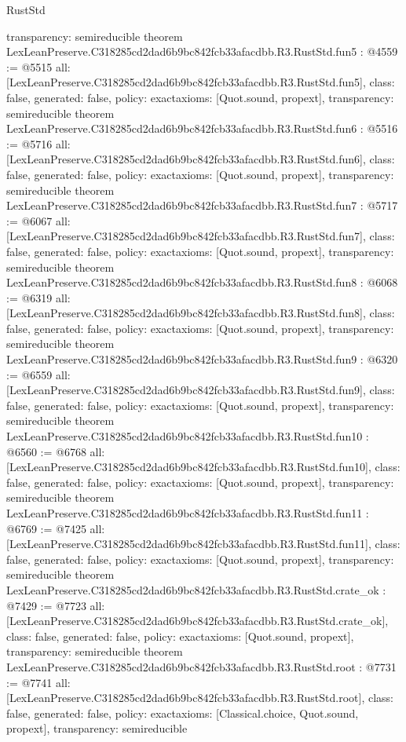 \begin{lexlean}{RustStd}
\begin{coremodule}
{  transparency: semireducible
}
theorem LexLeanPreserve.C318285cd2dad6b9bc842fcb33afacdbb.R3.RustStd.fun5 : @4559 := @5515 {
  all: [LexLeanPreserve.C318285cd2dad6b9bc842fcb33afacdbb.R3.RustStd.fun5],
  class: false,
  generated: false,
  policy: exact{axioms: [Quot.sound, propext]},
  transparency: semireducible
}
theorem LexLeanPreserve.C318285cd2dad6b9bc842fcb33afacdbb.R3.RustStd.fun6 : @5516 := @5716 {
  all: [LexLeanPreserve.C318285cd2dad6b9bc842fcb33afacdbb.R3.RustStd.fun6],
  class: false,
  generated: false,
  policy: exact{axioms: [Quot.sound, propext]},
  transparency: semireducible
}
theorem LexLeanPreserve.C318285cd2dad6b9bc842fcb33afacdbb.R3.RustStd.fun7 : @5717 := @6067 {
  all: [LexLeanPreserve.C318285cd2dad6b9bc842fcb33afacdbb.R3.RustStd.fun7],
  class: false,
  generated: false,
  policy: exact{axioms: [Quot.sound, propext]},
  transparency: semireducible
}
theorem LexLeanPreserve.C318285cd2dad6b9bc842fcb33afacdbb.R3.RustStd.fun8 : @6068 := @6319 {
  all: [LexLeanPreserve.C318285cd2dad6b9bc842fcb33afacdbb.R3.RustStd.fun8],
  class: false,
  generated: false,
  policy: exact{axioms: [Quot.sound, propext]},
  transparency: semireducible
}
theorem LexLeanPreserve.C318285cd2dad6b9bc842fcb33afacdbb.R3.RustStd.fun9 : @6320 := @6559 {
  all: [LexLeanPreserve.C318285cd2dad6b9bc842fcb33afacdbb.R3.RustStd.fun9],
  class: false,
  generated: false,
  policy: exact{axioms: [Quot.sound, propext]},
  transparency: semireducible
}
theorem LexLeanPreserve.C318285cd2dad6b9bc842fcb33afacdbb.R3.RustStd.fun10 : @6560 := @6768 {
  all: [LexLeanPreserve.C318285cd2dad6b9bc842fcb33afacdbb.R3.RustStd.fun10],
  class: false,
  generated: false,
  policy: exact{axioms: [Quot.sound, propext]},
  transparency: semireducible
}
theorem LexLeanPreserve.C318285cd2dad6b9bc842fcb33afacdbb.R3.RustStd.fun11 : @6769 := @7425 {
  all: [LexLeanPreserve.C318285cd2dad6b9bc842fcb33afacdbb.R3.RustStd.fun11],
  class: false,
  generated: false,
  policy: exact{axioms: [Quot.sound, propext]},
  transparency: semireducible
}
theorem LexLeanPreserve.C318285cd2dad6b9bc842fcb33afacdbb.R3.RustStd.crate_ok : @7429 := @7723 {
  all: [LexLeanPreserve.C318285cd2dad6b9bc842fcb33afacdbb.R3.RustStd.crate_ok],
  class: false,
  generated: false,
  policy: exact{axioms: [Quot.sound, propext]},
  transparency: semireducible
}
theorem LexLeanPreserve.C318285cd2dad6b9bc842fcb33afacdbb.R3.RustStd.root : @7731 := @7741 {
  all: [LexLeanPreserve.C318285cd2dad6b9bc842fcb33afacdbb.R3.RustStd.root],
  class: false,
  generated: false,
  policy: exact{axioms: [Classical.choice, Quot.sound, propext]},
  transparency: semireducible
}


\end{coremodule}
\end{lexlean}
